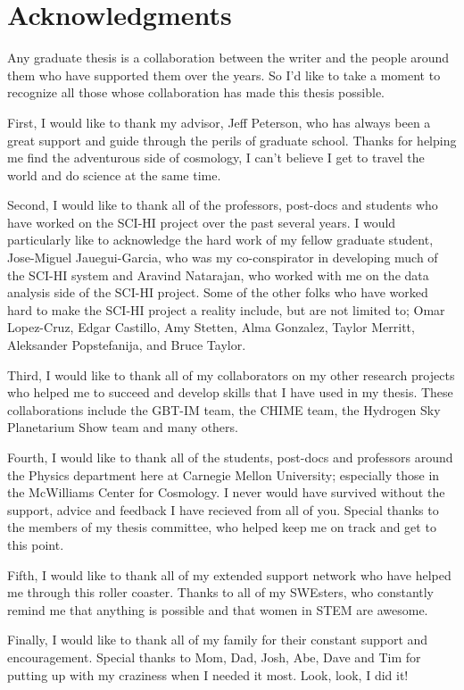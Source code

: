 \section*{Acknowledgments}

Any graduate thesis is a collaboration between the writer and the people around them who have supported them over the years. So I'd like to take a moment to recognize all those whose collaboration has made this thesis possible. 

First, I would like to thank my advisor, Jeff Peterson, who has always been a great support and guide through the perils of graduate school. Thanks for helping me find the adventurous side of cosmology, I can't believe I get to travel the world and do science at the same time.

Second, I would like to thank all of the professors, post-docs and students who have worked on the SCI-HI project over the past several years. I would particularly like to acknowledge the hard work of my fellow graduate student, Jose-Miguel Jauegui-Garcia, who was my co-conspirator in developing much of the SCI-HI system and Aravind Natarajan, who worked with me on the data analysis side of the SCI-HI project. Some of the other folks who have worked hard to make the SCI-HI project a reality include, but are not limited to; Omar Lopez-Cruz, Edgar Castillo, Amy Stetten, Alma Gonzalez, Taylor Merritt, Aleksander Popstefanija, and Bruce Taylor. 

Third, I would like to thank all of my collaborators on my other research projects who helped me to succeed and develop skills that I have used in my thesis. These collaborations include the GBT-IM team, the CHIME team, the Hydrogen Sky Planetarium Show team and many others. 

Fourth, I would like to thank all of the students, post-docs and professors around the Physics department here at Carnegie Mellon University; especially those in the McWilliams Center for Cosmology. I never would have survived without the support, advice and feedback I have recieved from all of you. Special thanks to the members of my thesis committee, who helped keep me on track and get to this point. 

Fifth, I would like to thank all of my extended support network who have helped me through this roller coaster. Thanks to all of my SWEsters, who constantly remind me that anything is possible and that women in STEM are awesome. 

Finally, I would like to thank all of my family for their constant support and encouragement. Special thanks to Mom, Dad, Josh, Abe, Dave and Tim for putting up with my craziness when I needed it most. Look, look, I did it!

